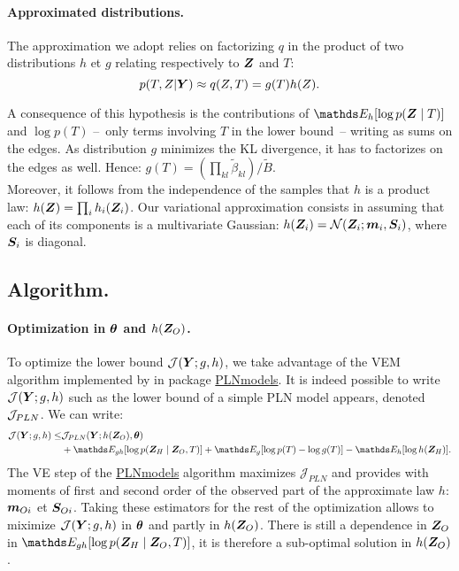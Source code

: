 \paragraph{Approximated distributions.}
The approximation we adopt relies on factorizing $q$ in the product of two distributions $h$ et $g$ relating respectively to $\boldsymbol{Z}$  and $T$: 
$$p(T,Z | \boldsymbol{Y}) \approx  q(Z,T) = g(T)h(Z).$$

 A consequence of this hypothesis is the contributions of   $\Esp_h[\log p(\Zbf\mid T)]$ and $\log p(T)$ --~only terms involving $T$ in the lower bound~-- writing as sums on the edges. As distribution   $g$ minimizes the KL divergence, it has to factorizes on the edges as well. Hence:
$ g(T) = \left(\prod_{kl} \widetilde{\beta}_{kl} \right) / \widetilde{B}$. \\
 
Moreover, it follows from the independence of the samples that $h$ is a product law: $ h(\boldsymbol{Z}) = \prod_i h_i(\boldsymbol{Z}_i)$.
Our variational approximation consists in assuming that each of its components is a multivariate Gaussian: $h(\boldsymbol{Z}_i) = \mathcal{N}(\boldsymbol{Z}_i; \boldsymbol{m}_i, \boldsymbol{S}_i)$, where $\boldsymbol{S}_i$ is diagonal. 

\subsection{Algorithm.}

\paragraph{Optimization in $\boldsymbol{\theta}$ and $h(\boldsymbol{Z}_O)$.}
To optimize  the lower bound $\mathcal{J}(\boldsymbol{Y}; g,h)$, we take advantage of the VEM algorithm implemented by \citet{CMR18,PLNnetwork} in package \url{PLNmodels}. It is indeed possible to write $\mathcal{J}(\boldsymbol{Y}; g,h)$ such as the lower bound of a simple PLN model appears, denoted $\mathcal{J}_{PLN}$. We can write:
\begin{align*}
\mathcal{J}(\Ybf; g,h) \leq & \mathcal{J}_{PLN}(\Ybf; h(\Zbf_O), \thetabf) \\
& + \Esp_{gh}[\log p(\Zbf_H \mid \Zbf_O,T) ]+\Esp_g[\log p(T)-\log g(T)]-\Esp_h[\log h(\Zbf_H)].
\end{align*}
The VE step of the \url{PLNmodels} algorithm maximizes $\mathcal{J}_{PLN}$ and provides with moments of first and second order of the observed part of the approximate law $h$: $\boldsymbol{m}_{Oi}$ et $\boldsymbol{S}_{Oi}$. Taking these estimators for the rest of the optimization allows to miximize $\mathcal{J}(\boldsymbol{Y};g,h)$ in $\boldsymbol{\theta}$ and partly in $h(\boldsymbol{Z}_O)$. There is still a dependence in $\boldsymbol{Z}_O$ in $\Esp_{gh}[\log p(\Zbf_H \mid \Zbf_O,T) ]$, it is therefore a sub-optimal solution in $h(\boldsymbol{Z}_O)$.

